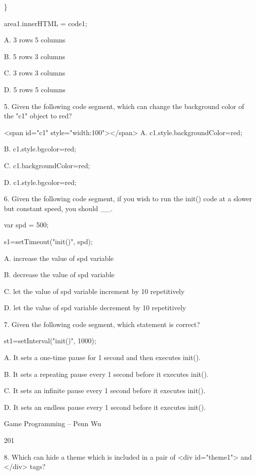 \documentclass[
]{article}
\begin{document}
\}

area1.innerHTML = code1;

A. 3 rows 5 columns

B. 5 rows 3 columns

C. 3 rows 3 columns

D. 5 rows 5 columns

5. Given the following code segment, which can change the background
color of the "c1" object to red?

\textless span id="c1"
style="width:100"\textgreater\textless/span\textgreater{} A.
c1.style.backgroundColor=\textquotesingle red\textquotesingle;

B. c1.style.bgcolor=\textquotesingle red\textquotesingle;

C. c1.backgroundColor=\textquotesingle red\textquotesingle;

D. c1.style.bgcolor=\textquotesingle red\textquotesingle;

6. Given the following code segment, if you wish to run the init() code
at a slower but constant speed, you should \_\_.

var spd = 500;

s1=setTimeout("init()", spd);

A. increase the value of spd variable

B. decrease the value of spd variable

C. let the value of spd variable increment by 10 repetitively

D. let the value of spd variable decrement by 10 repetitively

7. Given the following code segment, which statement is correct?

st1=setInterval("init()", 1000);

A. It sets a one-time pause for 1 second and then executes init().

B. It sets a repeating pause every 1 second before it executes init().

C. It sets an infinite pause every 1 second before it executes init().

D. It sets an endless pause every 1 second before it executes init().

Game Programming -- Penn Wu

201

\protect\hypertarget{index_split_011.htmlux5cux23p202}{}{}

8. Which can hide a theme which is included in a pair of \textless div
id="theme1"\textgreater{} and \textless/div\textgreater{} tags?
\end{document}
